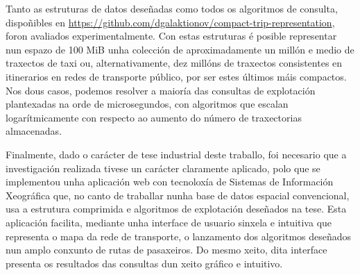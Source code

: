 Tanto as estruturas de datos dese\~nadas como todos os algoritmos de consulta, dispo\~nibles en \url{https://github.com/dgalaktionov/compact-trip-representation}, foron avaliados experimentalmente. Con estas estruturas \'e posible representar nun espazo de 100 MiB unha colecci\'on de aproximadamente un mill\'on e medio de traxectos de taxi ou, alternativamente, dez mill\'ons de traxectos consistentes en itinerarios en redes de transporte p\'ublico, por ser estes \'ultimos m\'ais compactos. Nos dous casos, podemos resolver a maior\'ia das consultas de explotaci\'on plantexadas na orde de microsegundos, con algoritmos que escalan logar\'itmicamente con respecto ao aumento do n\'umero de traxectorias almacenadas.

Finalmente, dado o car\'acter de tese industrial deste traballo, foi necesario que a investigaci\'on realizada tivese un car\'acter claramente aplicado, polo que se implementou unha aplicaci\'on web con tecnolox\'ia de Sistemas de Informaci\'on Xeogr\'afica que, no canto de traballar nunha base de datos espacial convencional, usa a estrutura comprimida e algoritmos de explotaci\'on dese\~nados na tese. Esta aplicaci\'on facilita, mediante unha interface de usuario sinxela e intuitiva que representa o mapa da rede de transporte, o lanzamento dos algoritmos dese\~nados nun amplo conxunto de rutas de pasaxeiros. Do mesmo xeito, dita interface presenta os resultados das consultas dun xeito gr\'afico e intuitivo.
 
